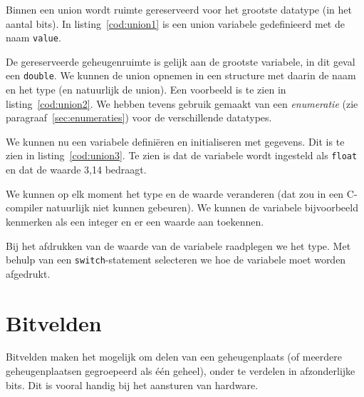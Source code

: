 Binnen een union wordt ruimte gereserveerd voor het grootste datatype (in het aantal bits). In listing~\ref{cod:union1} is een union variabele gedefinieerd met de naam \texttt{value}.


De gereserveerde geheugenruimte is gelijk aan de grootste variabele, in dit geval een \texttt{double}. We kunnen de union opnemen in een structure met daarin de naam en het type (en natuurlijk de union). Een voorbeeld is te zien in listing~\ref{cod:union2}. We hebben tevens gebruik gemaakt van een \textsl{enumeratie} (zie paragraaf~\ref{sec:enumeraties}) voor de verschillende datatypes.


We kunnen nu een variabele definiëren en initialiseren met gegevens. Dit is te zien in listing~\ref{cod:union3}. Te zien is dat de variabele wordt ingesteld als \texttt{float} en dat de waarde 3,14 bedraagt.


We kunnen op elk moment het type en de waarde veranderen (dat zou in een C-compiler natuurlijk niet kunnen gebeuren). We kunnen de variabele bijvoorbeeld kenmerken als een integer en er een waarde aan toekennen.


Bij het afdrukken van de waarde van de variabele raadplegen we het type. Met behulp van een \texttt{switch}-statement selecteren we hoe de variabele moet worden afgedrukt.


\section{Bitvelden}
Bitvelden maken het mogelijk om delen van een geheugenplaats (of meerdere geheugenplaatsen gegroepeerd als één geheel), onder te verdelen in afzonderlijke bits. Dit is vooral handig bij het aansturen van hardware.

